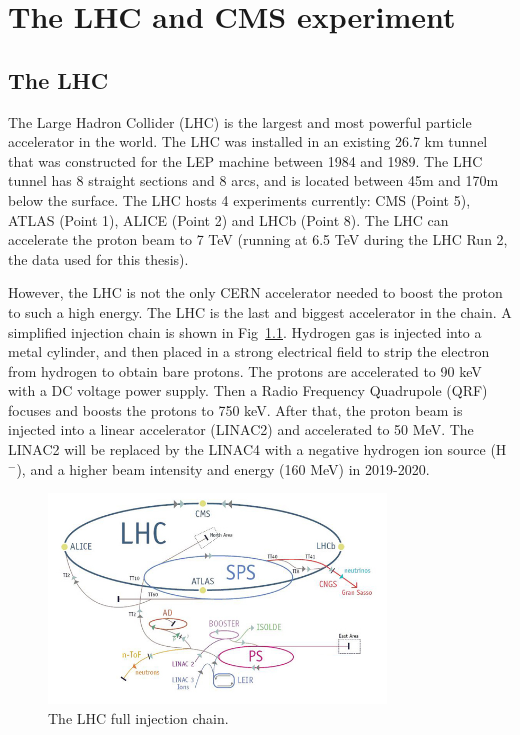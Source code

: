 \chapter{The LHC and CMS experiment}

\clearpage
\section{The LHC}

The Large Hadron Collider (LHC) is the largest and most powerful particle accelerator in the world. The LHC was installed in an existing 26.7 km tunnel that was constructed for the LEP machine between 1984 and 1989. The LHC tunnel has 8 straight sections and 8 arcs, and is located between 45m and 170m below the surface. The LHC hosts 4 experiments currently: CMS (Point 5), ATLAS (Point 1), ALICE (Point 2) and LHCb (Point 8). The LHC can accelerate the proton beam to 7 TeV (running at 6.5 TeV during the LHC Run 2, the data used for this thesis).

However, the LHC is not the only CERN accelerator needed to boost the proton to such a high energy. The LHC is the last and biggest accelerator in the chain. A simplified injection chain is shown in Fig~\ref{fig:c3lhclpsspslhc}. Hydrogen gas is injected into a metal cylinder, and then placed in a strong electrical field to strip the electron from hydrogen to obtain bare protons. The protons are accelerated to 90 keV with a DC voltage power supply. Then a Radio Frequency Quadrupole (QRF) focuses and boosts the protons to 750 keV. After that, the proton beam is injected into a linear accelerator (LINAC2) and accelerated to 50 MeV. The LINAC2 will be replaced by the LINAC4 with a negative hydrogen ion source (H$^{-}$), and a higher beam intensity and energy (160 MeV) in 2019-2020. 

\begin{figure}[htbp]
 \begin{center}
  \includegraphics[width=0.8\textwidth]{figures/c3/c3_lhc_lpsspslhc.jpg}
 \end{center}
 \caption{The LHC full injection chain.}
 \label{fig:c3lhclpsspslhc}
\end{figure}

